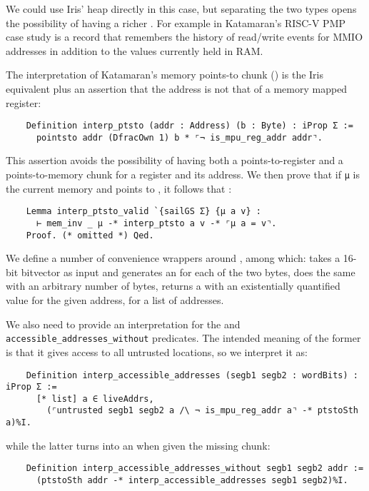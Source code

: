We could use Iris' heap directly in this case, but separating the two types opens the possibility of having a richer . For example in Katamaran's RISC-V PMP case study  is a record that remembers the history of read/write events for MMIO addresses in addition to the values currently held in RAM.

The interpretation of Katamaran's memory points-to chunk () is the Iris equivalent plus an assertion that the address is not that of a memory mapped register:
\begin{verbatim}
    Definition interp_ptsto (addr : Address) (b : Byte) : iProp Σ :=
      pointsto addr (DfracOwn 1) b * ⌜¬ is_mpu_reg_addr addr⌝.
\end{verbatim}
This assertion avoids the possibility of having both a points-to-register and a points-to-memory chunk for a register and its address.
We then prove that if \texttt{μ} is the current memory and  points to , it follows that :
\begin{verbatim}
    Lemma interp_ptsto_valid `{sailGS Σ} {μ a v} :
      ⊢ mem_inv _ μ -* interp_ptsto a v -* ⌜μ a = v⌝.
    Proof. (* omitted *) Qed.
\end{verbatim}

We define a number of convenience wrappers around , among which:  takes a 16-bit bitvector as input and generates an  for each of the two bytes,  does the same with an arbitrary number of bytes,  returns a  with an existentially quantified value for the given address,  for a list of addresses.

We also need to provide an interpretation for the  and \texttt{ac\-ces\-si\-ble\_ad\-dresses\_with\-out} predicates. The intended meaning of the former is that it gives access to all untrusted locations, so we interpret it as:
\begin{verbatim}
    Definition interp_accessible_addresses (segb1 segb2 : wordBits) : iProp Σ :=
      [* list] a ∈ liveAddrs,
        (⌜untrusted segb1 segb2 a /\ ¬ is_mpu_reg_addr a⌝ -* ptstoSth a)%I.
\end{verbatim}
while the latter turns into an  when given the missing chunk:
\begin{verbatim}
    Definition interp_accessible_addresses_without segb1 segb2 addr :=
      (ptstoSth addr -* interp_accessible_addresses segb1 segb2)%I.
\end{verbatim}

